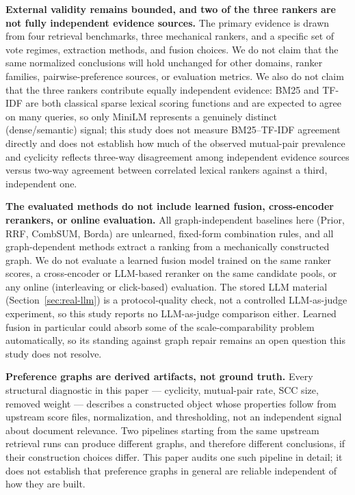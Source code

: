 \documentclass[manuscript,anonymous,review]{acmart}
\begin{document}
\textbf{External validity remains bounded, and two of the three rankers
are not fully independent evidence sources.} The primary evidence is drawn from
four retrieval benchmarks, three mechanical rankers, and a specific set of vote
regimes, extraction methods, and fusion choices. We do not claim that the same
normalized conclusions will hold unchanged for other domains, ranker families,
pairwise-preference sources, or evaluation metrics. We also do not claim that
the three rankers contribute equally independent evidence: BM25 and TF-IDF are
both classical sparse lexical scoring functions and are expected to agree on
many queries, so only MiniLM represents a genuinely distinct (dense/semantic)
signal; this study does not measure BM25--TF-IDF agreement directly and does
not establish how much of the observed mutual-pair prevalence and cyclicity
reflects three-way disagreement among independent evidence sources versus
two-way agreement between correlated lexical rankers against a third,
independent one.

\textbf{The evaluated methods do not include learned fusion, cross-encoder
rerankers, or online evaluation.} All graph-independent baselines here (Prior,
RRF, CombSUM, Borda) are unlearned, fixed-form combination rules, and all
graph-dependent methods extract a ranking from a mechanically constructed
graph. We do not evaluate a learned fusion model trained on the same ranker
scores, a cross-encoder or LLM-based reranker on the same candidate pools, or
any online (interleaving or click-based) evaluation. The stored LLM material
(Section~\ref{sec:real-llm}) is a protocol-quality check, not a controlled
LLM-as-judge experiment, so this study reports no LLM-as-judge comparison
either. Learned fusion in particular could absorb some of the
scale-comparability problem automatically, so its standing against graph
repair remains an open question this study does not resolve.

\textbf{Preference graphs are derived artifacts, not ground truth.} Every
structural diagnostic in this paper --- cyclicity, mutual-pair rate, SCC size,
removed weight --- describes a constructed object whose properties follow
from upstream score files, normalization, and thresholding, not an
independent signal about document relevance. Two pipelines starting from the
same upstream retrieval runs can produce different graphs, and therefore
different conclusions, if their construction choices differ. This paper
audits one such pipeline in detail; it does not establish that preference
graphs in general are reliable independent of how they are built.
\end{document}
